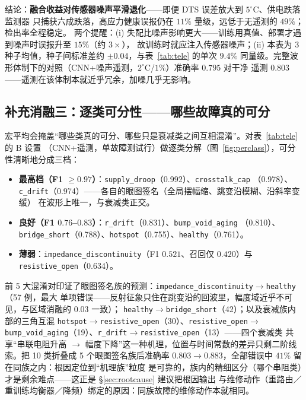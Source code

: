 \documentclass[11pt,a4paper,fontset=mac]{ctexart}
\begin{document}
结论：\textbf{融合收益对传感器噪声平滑退化}——即便 DTS 误差放大到 $5^\circ$C、供电跌落监测器
只捕获六成跌落，高应力健康误报仍在 $11\%$ 量级，远低于无遥测的 $49\%$；检出率全程稳定。
两个提醒：(i) 失配比噪声影响更大——训练用真值、部署才遇到噪声时误报升至 $15\%$（约 $3\times$），
故训练时就应注入传感器噪声；(ii) 本表为 3 种子均值，种子间标准差约 $\pm0.04$，与表~\ref{tab:tele}
的单次 $9.4\%$ 同量级。完整波形体制下的对照（CNN+噪声遥测，$2^\circ$C/$1\%$）准确率 $0.795$ 对干净
遥测 $0.803$——遥测在该体制本就近乎冗余，加噪几乎无影响。

\subsection{补充消融三：逐类可分性——哪些故障真的可分}\label{sec:perclass}
宏平均会掩盖“哪些类真的可分、哪些只是衰减类之间互相混淆”。对表~\ref{tab:tele} 的 B 设置
（CNN+遥测，单故障测试行）做逐类分解（图~\ref{fig:perclass}），可分性清晰地分成三档：

\begin{itemize}
\item \textbf{最高档（F1 $\geq0.97$）}：\texttt{supply\_droop}（0.992）、\texttt{crosstalk\_cap}
（0.978）、\texttt{c\_drift}（0.974）——各自的眼图签名（全局摆幅缩、跳变沿模糊、沿斜率变缓）
在波形上唯一，与衰减类正交。
\item \textbf{良好（F1 $0.76$--$0.83$）}：\texttt{r\_drift}（0.831）、\texttt{bump\_void\_aging}
（0.810）、\texttt{bridge\_short}（0.788）、\texttt{hotspot}（0.755）、\texttt{healthy}（0.761）。
\item \textbf{薄弱}：\texttt{impedance\_discontinuity}（F1 $0.521$、召回仅 $0.420$）与
\texttt{resistive\_open}（0.634）。
\end{itemize}

前 5 大混淆对印证了眼图签名族的预测：\texttt{impedance\_discontinuity}$\to$\texttt{healthy}（57 例，最大
单项错误——反射征象只住在跳变沿的回波里，幅度域近乎不可见，与区域消融的 $0.03$ 一致）；
\texttt{healthy}$\to$\texttt{bridge\_short}（42）；以及衰减族内部的三角互混
\texttt{hotspot}$\to$\texttt{resistive\_open}（30）、\texttt{resistive\_open}$\to$
\texttt{bump\_void\_aging}（19）、\texttt{r\_drift}$\to$\texttt{resistive\_open}（13）——四个衰减类
共享“串联电阻升高 $\to$ 幅度下降”这一种机理，位置与时间常数的差异只剩二阶线索。把 10 类折叠成
5 个眼图签名族后准确率 $0.803\to0.883$，全部错误中 $41\%$ 留在同族之内：根因定位到“机理族”粒度
是可靠的，族内的精细区分（哪个串阻类）才是剩余难点——这正是 \S\ref{sec:rootcause} 建议把根因输出
与维修动作（重路由／重训练均衡器／降频）绑定的原因：同族故障的维修动作本就相同。
\end{document}
